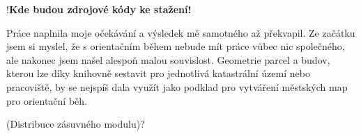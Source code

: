 !\textbf{Kde budou zdrojové kódy ke stažení!}

Práce naplnila moje očekávání a výsledek mě samotného až překvapil. Ze začátku jsem si myslel, že s orientačním během nebude mít práce vůbec nic společného, ale nakonec jsem našel alespoň malou souvislost. Geometrie parcel a budov, kterou lze díky knihovně sestavit pro jednotlivá katastrální území nebo pracoviště, by se nejspíš dala využít jako podklad pro vytváření městských map pro orientační běh.

(Distribuce zásuvného modulu)?
